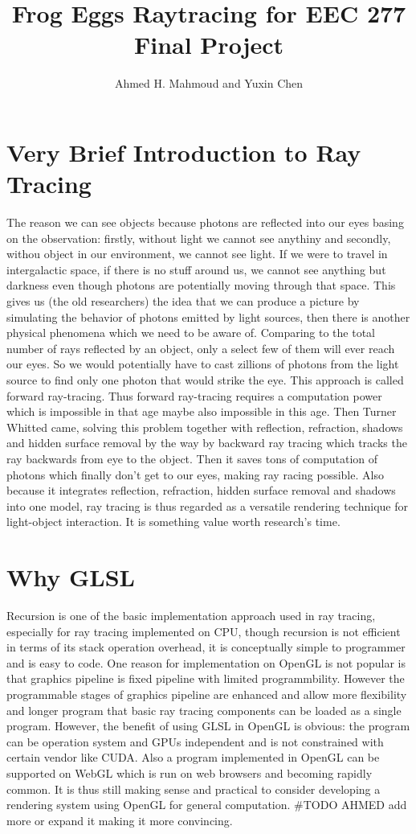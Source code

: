 \documentclass[a4paper,10pt]{article}
\title{Frog Eggs Raytracing for EEC 277 Final Project}
\author{Ahmed H. Mahmoud and Yuxin Chen}
\begin{document}
\maketitle

\section{Very Brief Introduction to Ray Tracing}
The reason we can see objects because photons are reflected into our eyes basing on the observation: firstly, without light we cannot see anythiny and secondly, withou object in our environment, we cannot see light. If we were to travel in intergalactic space, if there is no stuff around us, we cannot see anything but darkness even though photons are potentially moving through that space. This gives us (the old researchers) the idea that we can produce a picture by simulating the behavior of photons emitted by light sources, then there is another physical phenomena which we need to be aware of. Comparing to the total number of rays reflected by an object, only a select few of them will ever reach our eyes. So we would potentially have to cast zillions of photons from the light source to find only one photon that would strike the eye. This approach is called forward ray-tracing. Thus forward ray-tracing requires a computation power which is impossible in that age maybe also impossible in this age. Then Turner Whitted\cite{whitted2005improved} came, solving this problem together with reflection, refraction, shadows and hidden surface removal by the way by backward ray tracing which tracks the ray backwards from eye to the object. Then it saves tons of computation of photons which finally don't get to our eyes, making ray racing possible. Also because it integrates reflection, refraction, hidden surface removal and shadows into one model, ray tracing is thus regarded as a versatile rendering technique for light-object interaction. It is something value worth research's time.
\section{Why GLSL}
Recursion is one of the basic implementation approach used in ray tracing, especially for ray tracing implemented on CPU, though recursion is not efficient in terms of its stack operation overhead, it is conceptually simple to programmer and is easy to code. One reason for implementation on OpenGL is not popular is that graphics pipeline is fixed pipeline with limited programmbility. However the programmable stages of graphics pipeline are enhanced and allow more flexibility and longer program that basic ray tracing components can be loaded as a single program. However, the benefit of using GLSL in OpenGL is obvious: the program can be operation system and GPUs independent and is not constrained with certain vendor like CUDA. Also a program implemented in OpenGL can be supported on WebGL which is run on web browsers and becoming rapidly common. It is thus still making sense and practical to consider developing a rendering system using OpenGL for general computation.
\#TODO AHMED add more or expand it making it more convincing. 
\end{document}
